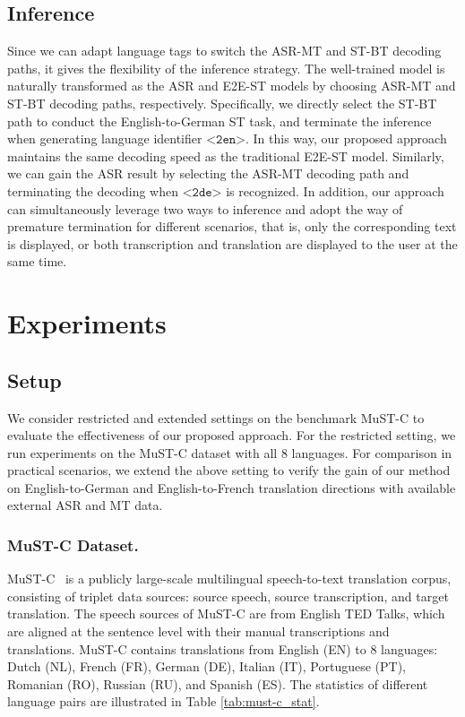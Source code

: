 \documentclass[letterpaper]{article} %
\begin{document}
\subsection*{Inference}
Since we can adapt language tags to switch the ASR-MT and ST-BT decoding paths, it gives the flexibility of the inference strategy.
The well-trained model is naturally transformed as the ASR and E2E-ST models by choosing ASR-MT and ST-BT decoding paths, respectively.
Specifically, we directly select the ST-BT path to conduct the English-to-German ST task, and terminate the inference when generating language identifier $\texttt{<2en>}$.
In this way, our proposed approach maintains the same decoding speed as the traditional E2E-ST model. 
Similarly, we can gain the ASR result by selecting the ASR-MT decoding path and terminating the decoding when $\texttt{<2de>}$ is recognized. 
In addition, our approach can simultaneously leverage two ways to inference and adopt the way of premature termination for different scenarios, that is, only the corresponding text is displayed, or both transcription and translation are displayed to the user at the same time.


\section{Experiments}

\subsection*{Setup}
 
We consider restricted and extended settings on the benchmark MuST-C to evaluate the effectiveness of our proposed approach. 
For the restricted setting, we run experiments on the MuST-C dataset with all 8 languages.
For comparison in practical scenarios, we extend the above setting to verify the gain of our method on English-to-German and English-to-French translation directions with available external ASR and MT data.  

\subsubsection{MuST-C Dataset.} 
MuST-C~\cite{Gangi2019MuSTCAM} is a publicly large-scale multilingual speech-to-text translation corpus, consisting of triplet data sources: source speech, source transcription, and target translation.
The speech sources of MuST-C are from English TED Talks, which are aligned at the sentence level with their manual transcriptions and translations. 
MuST-C contains translations from English (EN) to 8 languages: Dutch (NL), French (FR), German (DE), Italian (IT), Portuguese (PT), Romanian (RO), Russian (RU), and Spanish (ES).
The statistics of different language pairs are illustrated in Table \ref{tab:must-c_stat}.
\end{document}
